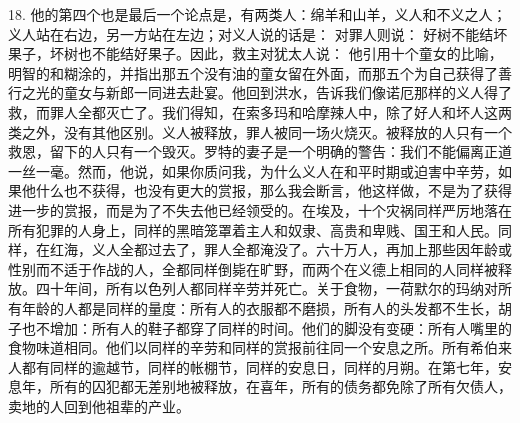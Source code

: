18. 他的第四个也是最后一个论点是，有两类人：绵羊和山羊，义人和不义之人；义人站在右边，另一方站在左边；对义人说的话是：  对罪人则说：  好树不能结坏果子，坏树也不能结好果子。因此，救主对犹太人说：  他引用十个童女的比喻，明智的和糊涂的，并指出那五个没有油的童女留在外面，而那五个为自己获得了善行之光的童女与新郎一同进去赴宴。他回到洪水，告诉我们像诺厄那样的义人得了救，而罪人全都灭亡了。我们得知，在索多玛和哈摩辣人中，除了好人和坏人这两类之外，没有其他区别。义人被释放，罪人被同一场火烧灭。被释放的人只有一个救恩，留下的人只有一个毁灭。罗特的妻子是一个明确的警告：我们不能偏离正道一丝一毫。然而，他说，如果你质问我，为什么义人在和平时期或迫害中辛劳，如果他什么也不获得，也没有更大的赏报，那么我会断言，他这样做，不是为了获得进一步的赏报，而是为了不失去他已经领受的。在埃及，十个灾祸同样严厉地落在所有犯罪的人身上，同样的黑暗笼罩着主人和奴隶、高贵和卑贱、国王和人民。同样，在红海，义人全都过去了，罪人全都淹没了。六十万人，再加上那些因年龄或性别而不适于作战的人，全都同样倒毙在旷野，而两个在义德上相同的人同样被释放。四十年间，所有以色列人都同样辛劳并死亡。关于食物，一荷默尔的玛纳对所有年龄的人都是同样的量度：所有人的衣服都不磨损，所有人的头发都不生长，胡子也不增加：所有人的鞋子都穿了同样的时间。他们的脚没有变硬：所有人嘴里的食物味道相同。他们以同样的辛劳和同样的赏报前往同一个安息之所。所有希伯来人都有同样的逾越节，同样的帐棚节，同样的安息日，同样的月朔。在第七年，安息年，所有的囚犯都无差别地被释放，在喜年，所有的债务都免除了所有欠债人，卖地的人回到他祖辈的产业。\par

